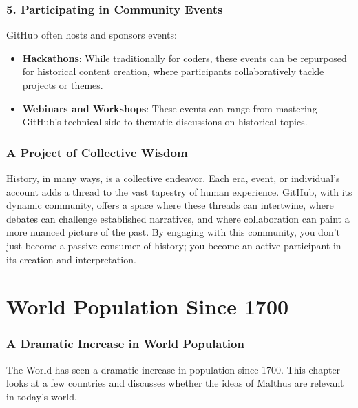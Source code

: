 \documentclass[a4paper,12pt]{book}
\begin{document}
\subsection*{5. Participating in Community Events}
GitHub often hosts and sponsors events:

\begin{itemize}
    \item \textbf{Hackathons}: While traditionally for coders, these events can be repurposed for historical content creation, where participants collaboratively tackle projects or themes.
    \item \textbf{Webinars and Workshops}: These events can range from mastering GitHub's technical side to thematic discussions on historical topics.
\end{itemize}

\subsection*{A Project of Collective Wisdom}
History, in many ways, is a collective endeavor. Each era, event, or individual's account adds a thread to the vast tapestry of human experience. GitHub, with its dynamic community, offers a space where these threads can intertwine, where debates can challenge established narratives, and where collaboration can paint a more nuanced picture of the past. By engaging with this community, you don't just become a passive consumer of history; you become an active participant in its creation and interpretation.

\chapter{World Population Since 1700}
\subsection*{A Dramatic Increase in World Population}
The World has seen a dramatic increase in population since 1700. This chapter looks at a few countries and discusses whether the ideas of Malthus are relevant in today's world.

\let\oldsection\section
\renewcommand{\section}[1]{\oldsection*{#1}\addcontentsline{toc}{section}{#1}}
\end{document}

